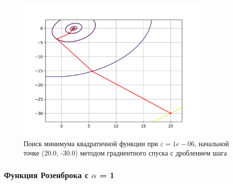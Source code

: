             \begin{figure}[H]
	        \centering
	        \includegraphics[width=0.85\textwidth]{Метод градиентного спуска с дробным шагом, eps 1e-06, start = (20.000000, -30.000000), Квадратичная функция}%
	        \caption{Поиск минимума квадратичной функции при $\varepsilon = 1e-06$, начальной точке (20.0, -30.0) методом градиентного спуска с дроблением шага}
	        \vspace*{-1.2cm}
            \end{figure}
            \subsubsection{Функция Розенброка с $\alpha$ = 1}

